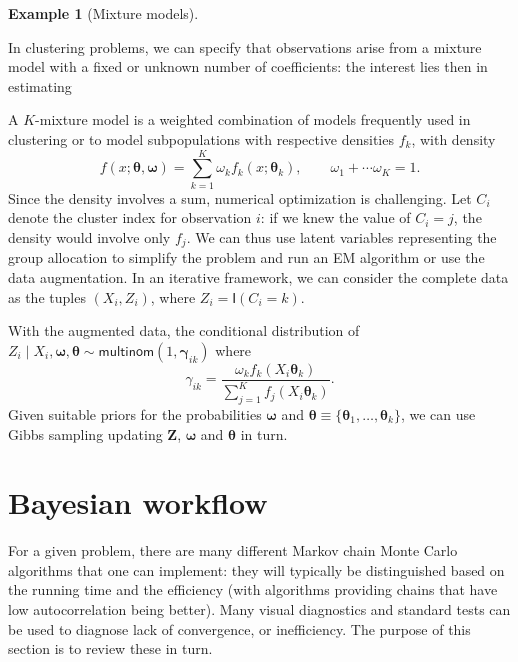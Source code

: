 \documentclass[
  11pt,
  letterpaper,
]{scrbook}
\theoremstyle{definition}
\theoremstyle{plain}
\theoremstyle{plain}
\theoremstyle{definition}
\theoremstyle{definition}
\newtheorem{example}{Example}[chapter]
\theoremstyle{remark}
\begin{document}
\begin{example}[Mixture
models]\protect\hypertarget{exm-mixture}{}\label{exm-mixture}

In clustering problems, we can specify that observations arise from a
mixture model with a fixed or unknown number of coefficients: the
interest lies then in estimating

A \(K\)-mixture model is a weighted combination of models frequently
used in clustering or to model subpopulations with respective densities
\(f_k\), with density
\[f(x; \boldsymbol{\theta}, \boldsymbol{\omega}) = \sum_{k=1}^K \omega_kf_k(x; \boldsymbol{\theta}_k), \qquad \omega_1 + \cdots \omega_K=1.\]
Since the density involves a sum, numerical optimization is challenging.
Let \(C_i\) denote the cluster index for observation \(i\): if we knew
the value of \(C_i =j\), the density would involve only \(f_j\). We can
thus use latent variables representing the group allocation to simplify
the problem and run an EM algorithm or use the data augmentation. In an
iterative framework, we can consider the complete data as the tuples
\((X_i, Z_i)\), where \(Z_i = \mathsf{I}(C_i=k)\).

With the augmented data, the conditional distribution of
\(Z_i \mid X_i, \boldsymbol{\omega}, \boldsymbol{\theta} \sim \mathsf{multinom}(1, \boldsymbol{\gamma}_{ik})\)
where
\[\gamma_{ik} = \frac{\omega_k f_k(X_i\boldsymbol{\theta}_k)}{\sum_{j=1}^K f_j(X_i\boldsymbol{\theta}_k)}.\]
Given suitable priors for the probabilities \(\boldsymbol{\omega}\) and
\(\boldsymbol{\theta} \equiv \{\boldsymbol{\theta}_1, \ldots, \boldsymbol{\theta}_k\}\),
we can use Gibbs sampling updating \(\boldsymbol{Z}\),
\(\boldsymbol{\omega}\) and \(\boldsymbol{\theta}\) in turn.

\end{example}


\chapter{Bayesian workflow}\label{bayesian-workflow}

For a given problem, there are many different Markov chain Monte Carlo
algorithms that one can implement: they will typically be distinguished
based on the running time and the efficiency (with algorithms providing
chains that have low autocorrelation being better). Many visual
diagnostics and standard tests can be used to diagnose lack of
convergence, or inefficiency. The purpose of this section is to review
these in turn.
\end{document}
